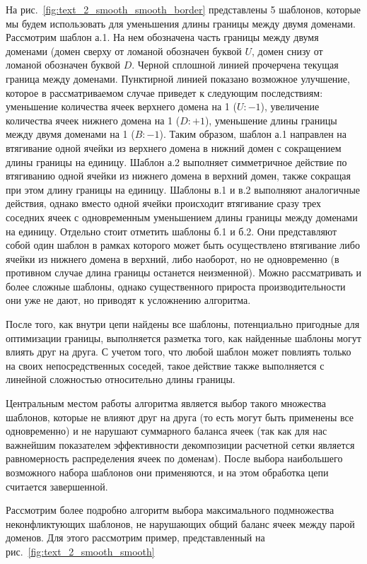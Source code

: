 На рис.~\ref{fig:text_2_smooth_smooth_border} представлены 5 шаблонов, которые мы будем использовать для уменьшения длины границы между двумя доменами.
Рассмотрим шаблон а.1.
На нем обозначена часть границы между двумя доменами (домен сверху от ломаной обозначен буквой $U$, домен снизу от ломаной обозначен буквой $D$.
Черной сплошной линией прочерчена текущая граница между доменами.
Пунктирной линией показано возможное улучшение, которое в рассматриваемом случае приведет к следующим последствиям: уменьшение количества ячеек верхнего домена на 1 ($U: -1$), увеличение количества ячеек нижнего домена на 1 ($D: + 1$), уменьшение длины границы между двумя доменами на 1 ($B: -1$).
Таким образом, шаблон а.1 направлен на втягивание одной ячейки из верхнего домена в нижний домен с сокращением длины границы на единицу.
Шаблон а.2 выполняет симметричное действие по втягиванию одной ячейки из нижнего домена в верхний домен, также сокращая при этом длину границы на единицу.
Шаблоны в.1 и в.2 выполняют аналогичные действия, однако вместо одной ячейки происходит втягивание сразу трех соседних ячеек с одновременным уменьшением длины границы между доменами на единицу. Отдельно стоит отметить шаблоны б.1 и б.2.
Они представляют собой один шаблон в рамках которого может быть осуществлено втягивание либо ячейки из нижнего домена в верхний, либо наоборот, но не одновременно (в противном случае длина границы останется неизменной).
Можно рассматривать и более сложные шаблоны, однако существенного прироста производительности они уже не дают, но приводят к усложнению алгоритма.

После того, как внутри цепи найдены все шаблоны, потенциально пригодные для оптимизации границы, выполняется разметка того, как найденные шаблоны могут влиять друг на друга.
С учетом того, что любой шаблон может повлиять только на своих непосредственных соседей, такое действие также выполняется с линейной сложностью относительно длины границы.

Центральным местом работы алгоритма является выбор такого множества шаблонов, которые не влияют друг на друга (то есть могут быть применены все одновременно) и не нарушают суммарного баланса ячеек (так как для нас важнейшим показателем эффективности декомпозиции расчетной сетки является равномерность распределения ячеек по доменам).
После выбора наибольшего возможного набора шаблонов они применяются, и на этом обработка цепи считается завершенной.

Рассмотрим более подробно алгоритм выбора максимального подмножества неконфликтующих шаблонов, не нарушающих общий баланс ячеек между парой доменов.
Для этого рассмотрим пример, представленный на рис.~\ref{fig:text_2_smooth_smooth}

